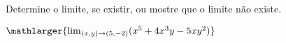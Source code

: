 Determine o limite, se existir, ou mostre que o limite não existe.

 \item$\mathlarger{\lim_{(x,y)\rightarrow(5,-2)} (x^5+4x^3y-5xy^2)}$